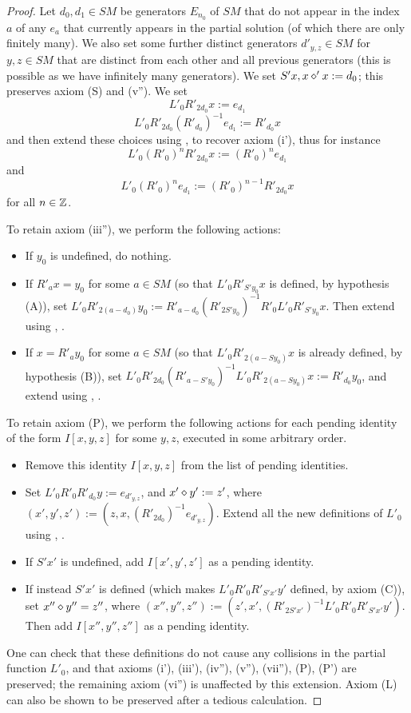 \begin{proof}  Let $d_0, d_1 \in SM$ be generators $E_{n_0}$ of $SM$ that do not appear in the index $a$ of any $e_a$ that currently appears in the partial solution (of which there are only finitely many).  We also set some further distinct generators $d'_{y,z} \in SM$ for $y,z \in SM$ that are distinct from each other and all previous generators (this is possible as we have infinitely many generators).  We set $S'x,  x \diamond' x := d_0$; this preserves axiom (S) and (v'').  We set
$$ L'_0 R'_{2d_0} x := e_{d_1}$$
$$ L'_0 R'_{2d_0} (R'_{d_0})^{-1} e_{d_1} := R'_{d_0} x$$
and then extend these choices using ,  to recover axiom (i'), thus for instance
$$ L'_0 (R'_0)^n R'_{2d_0} x := (R'_0)^n e_{d_1}$$
and
$$ L'_0 (R'_0)^n e_{d_1}  := (R'_0)^{n-1} R'_{2d_0} x$$
for all $n \in \mathbb{Z}$.

To retain axiom (iii''), we perform the following actions:
\begin{itemize}
\item If $y_0$ is undefined, do nothing.
\item If $R'_a x = y_0$ for some $a \in SM$ (so that $L'_0 R'_{S'y_0} x$ is defined, by hypothesis (A)), set $L'_0 R'_{2(a-d_0)} y_0 := R'_{a-d_0} (R'_{2S'y_0})^{-1} R'_0 L'_0 R'_{S'y_0} x$. Then extend using , .
\item If $x = R'_a y_0$ for some $a \in SM$ (so that $L'_0 R'_{2(a-Sy_0)} x$ is already defined, by hypothesis (B)), set $L'_0 R'_{2d_0} (R'_{a-S'y_0})^{-1} L'_0 R'_{2(a-Sy_0)} x :=R'_{d_0} y_0$, and extend using , .
\end{itemize}
To retain axiom (P), we perform the following actions for each pending identity of the form $I[x,y,z]$ for some $y,z$, executed in some arbitrary order.
\begin{itemize}
\item Remove this identity $I[x,y,z]$ from the list of pending identities.
\item Set $L'_0 R'_0 R'_{d_0} y := e_{d'_{y,z}}$, and $x' \diamond y' := z'$, where $(x',y',z') := (z, x, (R'_{2d_0})^{-1} e_{d'_{y,z}})$. Extend all the new definitions of $L'_0$ using , .
\item If $S'x'$ is undefined, add $I[x',y',z']$ as a pending identity.
\item If instead $S'x'$ is defined (which makes $L'_0 R'_0 R'_{S'x'} y'$ defined, by axiom (C)), set $x'' \diamond y'' = z''$, where $(x'',y'',z'') := (z', x', (R'_{2S'x'})^{-1} L'_0 R'_0 R'_{S'x'} y')$.  Then add $I[x'',y'',z'']$ as a pending identity.
\end{itemize}
One can check that these definitions do not cause any collisions in the partial function $L'_0$, and that axioms (i'), (iii'), (iv''), (v''), (vii''), (P), (P') are preserved; the remaining axiom (vi'') is unaffected by this extension.  Axiom (L) can also be shown to be preserved after a tedious calculation.
\end{proof}



